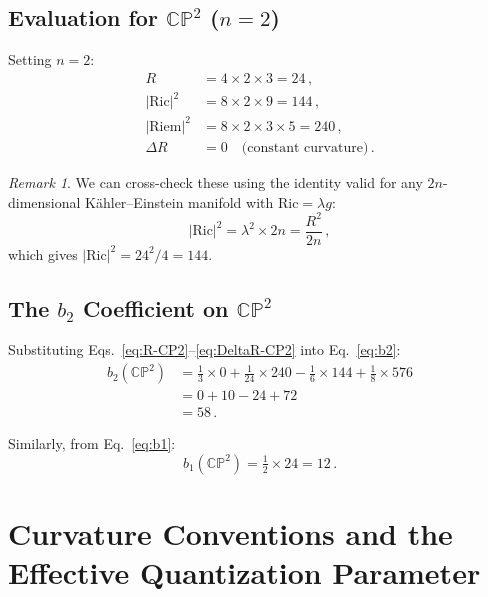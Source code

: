 \documentclass[12pt,a4paper]{article}
\theoremstyle{definition}
\theoremstyle{remark}
\newtheorem{remark}{Remark}
\newcommand{\CP}{\mathbb{CP}}
\newcommand{\Ric}{\mathrm{Ric}}
\newcommand{\Riem}{\mathrm{Riem}}
\begin{document}
\subsection{Evaluation for $\CP^2$ ($n=2$)}

Setting $n = 2$:
\begin{align}
R &= 4 \times 2 \times 3 = 24\,,
\label{eq:R-CP2}\\
|\Ric|^2 &= 8 \times 2 \times 9 = 144\,,
\label{eq:Ric-CP2}\\
|\Riem|^2 &= 8 \times 2 \times 3 \times 5 = 240\,,
\label{eq:Riem-CP2}\\
\Delta R &= 0 \quad \text{(constant curvature)}\,.
\label{eq:DeltaR-CP2}
\end{align}

\begin{remark}
We can cross-check these using the identity valid for any
$2n$-dimensional K\"ahler--Einstein manifold with $\Ric = \lambda g$:
\begin{equation}
|\Ric|^2 = \lambda^2 \times 2n = \frac{R^2}{2n}\,,
\end{equation}
which gives $|\Ric|^2 = 24^2/4 = 144$. \checkmark
\end{remark}

\subsection{The $b_2$ Coefficient on $\CP^2$}

Substituting Eqs.~\eqref{eq:R-CP2}--\eqref{eq:DeltaR-CP2} into
Eq.~\eqref{eq:b2}:
\begin{align}
b_2(\CP^2)
&= \tfrac{1}{3}\times 0
  + \tfrac{1}{24}\times 240
  - \tfrac{1}{6}\times 144
  + \tfrac{1}{8}\times 576 \nonumber\\
&= 0 + 10 - 24 + 72 \nonumber\\
&= 58\,.
\label{eq:b2-CP2}
\end{align}

Similarly, from Eq.~\eqref{eq:b1}:
\begin{equation}
b_1(\CP^2) = \tfrac{1}{2}\times 24 = 12\,.
\label{eq:b1-CP2}
\end{equation}

\section{Curvature Conventions and the Effective Quantization Parameter}
\label{sec:conventions}
\end{document}
